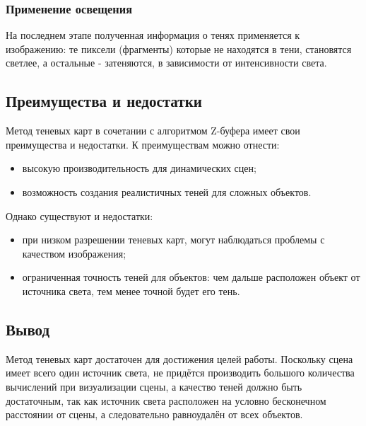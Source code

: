 \subsubsection*{Применение освещения} 

На последнем этапе полученная информация о тенях применяется к изображению: те пиксели (фрагменты) которые не находятся в тени, становятся светлее, а остальные - затеняются, в зависимости от интенсивности света.

\subsection*{Преимущества и недостатки}

Метод теневых карт в сочетании с алгоритмом Z-буфера имеет свои преимущества и недостатки. К преимуществам можно отнести:

\begin{itemize}
    \item высокую производительность для динамических сцен;
    \item возможность создания реалистичных теней для сложных объектов.
\end{itemize}

Однако существуют и недостатки:

\begin{itemize}
    \item при низком разрешении теневых карт, могут наблюдаться проблемы с качеством изображения;
    \item ограниченная точность теней для объектов: чем дальше расположен объект от источника света, тем менее точной будет его тень.
\end{itemize}

\subsection*{Вывод}

Метод теневых карт достаточен для достижения целей работы. Поскольку сцена имеет всего один источник света, не придётся производить большого количества вычислений при визуализации сцены, а качество теней должно быть достаточным, так как источник света расположен на условно бесконечном расстоянии от сцены, а следовательно равноудалён от всех объектов. 
